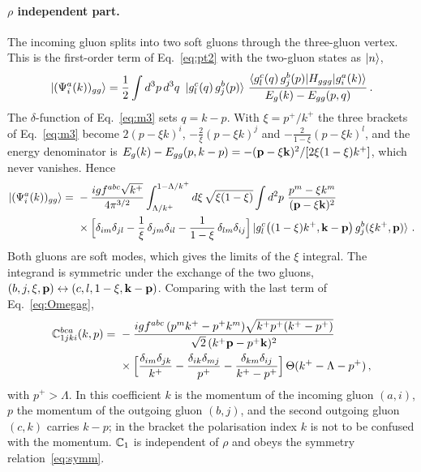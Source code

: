 \paragraph{$\rho$ independent part.} The incoming gluon splits into two soft gluons through the three-gluon vertex. This is the first-order term of Eq.~\eqref{eq:pt2} with the two-gluon states as $\ket n$,
\begin{align}\label{eq:psigg_def}
\ket{(\Psi^a_i(k))_{gg}}=\frac12\int d^3p\,d^3q\ \ket{g^c_l(q)\,g^b_j(p)}\,\frac{\braket{g^c_l(q)\,g^b_j(p)|H_{ggg}|g^a_i(k)}}{E_g(k)-E_{gg}(p,q)}\,.
\end{align}
The $\delta$-function of Eq.~\eqref{eq:m3} sets $q=k-p$. With $\xi=p^+/k^+$ the three brackets of Eq.~\eqref{eq:m3} become $2(p-\xi k)^i$, $-\frac2\xi(p-\xi k)^j$ and $-\frac{2}{1-\xi}(p-\xi k)^l$, and the energy denominator is $E_g(k)-E_{gg}(p,k-p)=-(\mathbf{p}-\xi\mathbf{k})^2/[2\xi(1-\xi)k^+]$, which never vanishes. Hence
\begin{align}\label{eq:psigg}
\ket{(\Psi^a_i(k))_{gg}}=\ &-\frac{igf^{abc}\sqrt{k^+}}{4\pi^{3/2}}\int_{\Lambda/k^+}^{1-\Lambda/k^+}d\xi\,\sqrt{\xi(1-\xi)}\int d^2p\ \frac{p^m-\xi k^m}{(\v p-\xi\v k)^2}\notag\\
&\times\Big[\delta_{im}\delta_{jl}-\frac1\xi\,\delta_{jm}\delta_{il}-\frac{1}{1-\xi}\,\delta_{lm}\delta_{ij}\Big]\ket{g^c_l\big((1-\xi)k^+,\v k-\v p\big)\,g^b_j(\xi k^+,\v p)}\,.
\end{align}
Both gluons are soft modes, which gives the limits of the $\xi$ integral. The integrand is symmetric under the exchange of the two gluons, $(b,j,\xi,\mathbf{p})\leftrightarrow(c,l,1-\xi,\mathbf{k}-\mathbf{p})$. Comparing with the last term of Eq.~\eqref{eq:Omegag},
\begin{align}\label{eq:C1mom}
\mf C^{bca}_{1jki}(k,p)=\ &-\frac{igf^{abc}\,(p^mk^+-p^+k^m)\sqrt{k^+p^+(k^+-p^+)}}{\sqrt2\,(k^+\v p-p^+\v k)^2}\notag\\&\times\Big[\frac{\delta_{im}\delta_{jk}}{k^+}-\frac{\delta_{ik}\delta_{mj}}{p^+}-\frac{\delta_{km}\delta_{ij}}{k^+-p^+}\Big]\,\Theta(k^+-\Lambda-p^+)\,,
\end{align}
with $p^+>\Lambda$. In this coefficient $k$ is the momentum of the incoming gluon $(a,i)$, $p$ the momentum of the outgoing gluon $(b,j)$, and the second outgoing gluon $(c,k)$ carries $k-p$; in the bracket the polarisation index $k$ is not to be confused with the momentum. $\mathbb{C}_1$ is independent of $\rho$ and obeys the symmetry relation~\eqref{eq:symm}.

